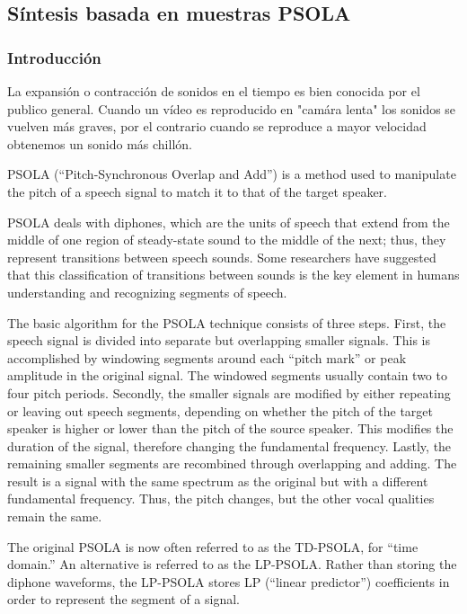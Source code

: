 \subsection{Síntesis basada en muestras PSOLA}

\subsubsection{Introducción}
La expansión o contracción de sonidos en el tiempo es bien conocida por el publico general. Cuando un vídeo es reproducido en "camára lenta" los sonidos se vuelven más graves, por el contrario cuando se reproduce a mayor velocidad obtenemos un sonido más chillón. 



PSOLA (“Pitch-Synchronous Overlap and Add”) is a method used to manipulate the pitch of a speech signal to match it to that of the target speaker.

PSOLA deals with diphones, which are the units of speech that extend from the middle of one region of steady-state sound to the middle of the next; thus, they represent transitions between speech sounds. Some researchers have suggested that this classification of transitions between sounds is the key element in humans understanding and recognizing segments of speech.

The basic algorithm for the PSOLA technique consists of three steps. First, the speech signal is divided into separate but overlapping smaller signals. This is accomplished by windowing segments around each “pitch mark” or peak amplitude in the original signal. The windowed segments usually contain two to four pitch periods. Secondly, the smaller signals are modified by either repeating or leaving out speech segments, depending on whether the pitch of the target speaker is higher or lower than the pitch of the source speaker. This modifies the duration of the signal, therefore changing the fundamental frequency. Lastly, the remaining smaller segments are recombined through overlapping and adding. The result is a signal with the same spectrum as the original but with a different fundamental frequency. Thus, the pitch changes, but the other vocal qualities remain the same.

The original PSOLA is now often referred to as the TD-PSOLA, for “time domain.” An alternative is referred to as the LP-PSOLA. Rather than storing the diphone waveforms, the LP-PSOLA stores LP (“linear predictor”) coefficients in order to represent the segment of a signal.


